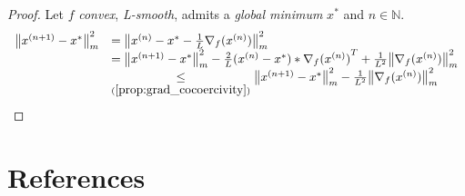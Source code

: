 \documentclass[11pt,en]{elegantpaper}
\newcommand{\norm}[1]{\left\lVert#1\right\rVert}
\begin{document}
\begin{proof}
  Let $f$ \textit{convex}, \textit{L-smooth}, admits a \textit{global minimum} $x^*$ and $n \in \mathbb{N}$.
  \begin{equation*}
    \begin{array}{ll}
      \norm{x^{(n+1)} - x^*}^2_m  & = \norm{x^{(n)} - x^* - \frac{1}{L}{\nabla_f(x^{(n)})}}^2_m \\
      & = \norm{x^{(n+1)} - x^*}^2_m - \frac{2}{L}(x^{(n)} - x^*)*{\nabla_f(x^{(n)})}^T + \frac{1}{L^2}{\norm{\nabla_f(x^{(n)})}^2_m} \\
      & \underset{(\ref{prop:grad_cocoercivity})}{\leq} \norm{x^{(n+1)} - x^*}^2_m - \frac{1}{L^2}{\norm{\nabla_f(x^{(n)})}^2_m}
    \end{array}
  \end{equation*} \par
\end{proof}



\section{References}
\end{document}
